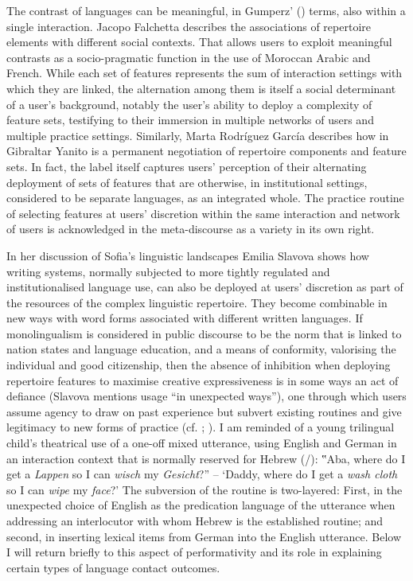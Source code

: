 \documentclass[output=paper]{langscibook}
\begin{document}
The contrast of languages can be meaningful, in Gumperz’ (\citeyear{gumperz_discourse_1982}) terms, also within a single interaction. Jacopo Falchetta describes the associations of repertoire elements with different social contexts. That allows users to exploit meaningful contrasts as a socio-pragmatic function in the use of Moroccan Arabic and French. While each set of features represents the sum of interaction settings with which they are linked, the alternation among them is itself a social determinant of a user’s background, notably the user’s ability to deploy a complexity of feature sets, testifying to their immersion in multiple networks of users and multiple practice settings. Similarly, Marta Rodríguez García describes how in Gibraltar Yanito is a permanent negotiation of repertoire components and feature sets. In fact, the label itself captures users’ perception of their alternating deployment of sets of features that are otherwise, in institutional settings, considered to be separate languages, as an integrated whole. The practice routine of selecting features at users’ discretion within the same interaction and network of users is acknowledged in the meta-discourse as a variety in its own right.

In her discussion of Sofia’s linguistic landscapes Emilia Slavova shows how writing systems, normally subjected to more tightly regulated and institutionalised language use, can also be deployed at users’ discretion as part of the resources of the complex linguistic repertoire. They become combinable in new ways with word forms associated with different written languages. If monolingualism is considered in public discourse to be the norm that is linked to nation states and language education, and a means of conformity, valorising the individual and good citizenship, then the absence of inhibition when deploying repertoire features to maximise creative expressiveness is in some ways an act of defiance (Slavova mentions usage “in unexpected ways”), one through which users assume agency to draw on past experience but subvert existing routines and give legitimacy to new forms of practice (cf. \citealt{emirbayer_what_1998}; \citealt{liddicoat_agency_2020}). I am reminded of a young trilingual child’s theatrical use of a one-off mixed utterance, using English and German in an interaction context that is normally reserved for Hebrew (\citealt{matras_language_2009}/\citeyear[38]{matras_language_2020}): ‟Aba, where do I get a \textit{Lappen} so I can \textit{wisch} my \textit{Gesicht}?” – ‘Daddy, where do I get a \textit{wash cloth} so I can \textit{wipe} my \textit{face}?’ The subversion of the routine is two-layered: First, in the unexpected choice of English as the predication language of the utterance when addressing an interlocutor with whom Hebrew is the established routine; and second, in inserting lexical items from German into the English utterance. Below I will return briefly to this aspect of performativity and its role in explaining certain types of language contact outcomes.
\end{document}
